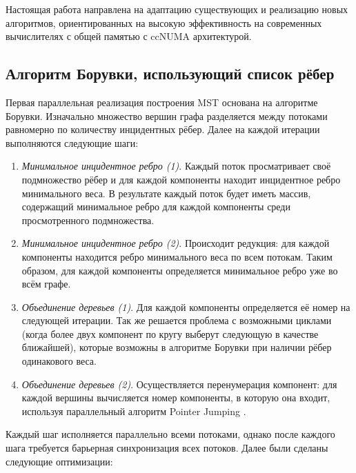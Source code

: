 \documentclass{article}
\begin{document}
Настоящая работа направлена на адаптацию существующих и реализацию новых алгоритмов, ориентированных на высокую эффективность на современных вычислителях с общей памятью с ccNUMA архитектурой.

\subsection{Алгоритм Борувки, использующий список рёбер}
Первая параллельная реализация построения MST основана на алгоритме Борувки. 
Изначально множество вершин графа разделяется между потоками равномерно по количеству инцидентных рёбер.
Далее на каждой итерации выполняются следующие шаги:
\begin{enumerate}
    \item \textit{Минимальное инцидентное ребро (1)}.
          Каждый поток просматривает своё подмножество рёбер и для каждой компоненты находит инцидентное ребро минимального веса. 
          В результате каждый поток будет иметь массив, содержащий минимальное ребро для каждой компоненты среди просмотренного подмножества.
    \item \textit{Минимальное инцидентное ребро (2)}.
          Происходит редукция: для каждой компоненты находится ребро минимального веса по всем потокам. 
          Таким образом, для каждой компоненты определяется минимальное ребро уже во всём графе.
    \item \textit{Объединение деревьев (1)}.
          Для каждой компоненты определяется её номер на следующей итерации.
          Так же решается проблема с возможными циклами (когда более двух компонент по кругу выберут следующую в качестве ближайшей), которые возможны в алгоритме Борувки при наличии рёбер одинакового веса.
    \item \textit{Объединение деревьев (2)}.
          Осуществляется перенумерация компонент: для каждой вершины вычисляется номер компоненты, в которую она входит, используя параллельный алгоритм Pointer Jumping \cite{pointer-jumping}.
\end{enumerate}
Каждый шаг исполняется параллельно всеми потоками, однако после каждого шага требуется барьерная синхронизация всех потоков.
Далее были сделаны следующие оптимизации:
\end{document}
